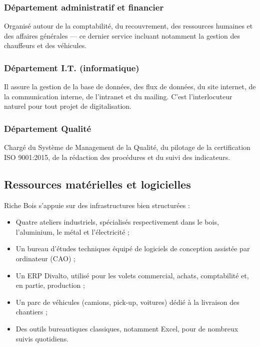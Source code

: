 \documentclass[12pt,a4paper]{report}
\begin{document}
\subsubsection{Département administratif et financier}

Organisé autour de la comptabilité, du recouvrement, des ressources humaines et des affaires générales — ce dernier service incluant notamment la gestion des chauffeurs et des véhicules.

\subsubsection{Département I.T. (informatique)}

Il assure la gestion de la base de données, des flux de données, du site internet, de la communication interne, de l'intranet et du mailing. C'est l'interlocuteur naturel pour tout projet de digitalisation.

\subsubsection{Département Qualité}

Chargé du Système de Management de la Qualité, du pilotage de la certification ISO 9001:2015, de la rédaction des procédures et du suivi des indicateurs.

\subsection{Ressources matérielles et logicielles}

Riche Bois s'appuie sur des infrastructures bien structurées :

\begin{itemize}
\item Quatre ateliers industriels, spécialisés respectivement dans le bois, l'aluminium, le métal et l'électricité ;
\item Un bureau d'études techniques équipé de logiciels de conception assistée par ordinateur (CAO) ;
\item Un ERP Divalto, utilisé pour les volets commercial, achats, comptabilité et, en partie, production ;
\item Un parc de véhicules (camions, pick-up, voitures) dédié à la livraison des chantiers ;
\item Des outils bureautiques classiques, notamment Excel, pour de nombreux suivis quotidiens.
\end{itemize}
\end{document}
